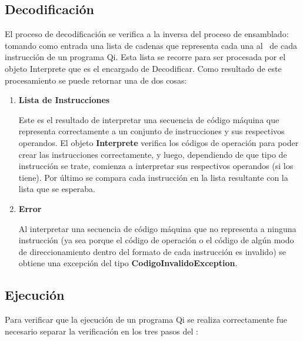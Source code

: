 \subsection{Decodificación}

El proceso de decodificación se verifica a la inversa del proceso de ensamblado: tomando como entrada una lista de cadenas que representa cada una al \codmaq\ de cada instrucción de un programa Qi. Esta lista se recorre para ser procesada por el objeto Interprete que es el encargado de Decodificar. Como resultado de este procesamiento se puede retornar una de dos cosas:
 
\begin{enumerate}
\item \textbf{Lista de Instrucciones} 

Este es el resultado de interpretar una secuencia de código máquina que representa correctamente a un conjunto de instrucciones y sus respectivos operandos. El objeto \textbf{Interprete} verifica los códigos de operación para poder crear las instrucciones correctamente, y luego, dependiendo de que tipo de instrucción se trate, comienza a interpretar sus respectivos operandos (si los tiene).
Por último se compara cada instrucción en la lista resultante con la lista que se esperaba.

\item\textbf{Error}

Al interpretar una secuencia de código máquina que no representa a ninguna instrucción (ya sea porque el código de operación o el código de algún modo de direccionamiento dentro del formato de cada instrucción es invalido) se obtiene una excepción del tipo \textbf{CodigoInvalidoException}.   
\end{enumerate}

\subsection{Ejecución}

Para verificar que la ejecución de un programa Qi se realiza correctamente fue necesario separar la verificación en los tres pasos del \ciclo:

